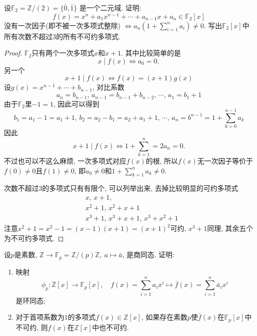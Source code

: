 \begin{problem}
    设$\mathbb{F}_2 = \mathbb{Z}/(2) = \{\bar{0}, \bar{1}\}$
是一个二元域. 证明: 
\[
    f(x) = x^n + a_1x^{n - 1} + \cdots + a_{n - 1}x + a_n \in \mathbb{F}_2[x]
\]
没有一次因子(即不被一次多项式整除)
\(
    \Leftrightarrow a_n\left(1 + \sum_{i = 1}^n a_i\right) \neq 0.
\)
写出$\mathbb{F}_2[x]$中所有次数不超过$3$的所有不可约多项式.
\end{problem}

\begin{proof}
    $\mathbb{F}_2$只有两个一次多项式$x$和$x + 1$. 其中比较简单的是
    \[
        x \mid f(x) \iff a_0 = 0,
    \]
    另一个
    \[
        x + 1 \mid f(x) \iff f(x) = (x + 1)g(x)
    \]
    设$g(x) = x^{n - 1} + \cdots + b_{n - 1}$, 对比系数
    \[
        a_n = b_{n - 1},\, a_{n - 1} = b_{n - 1} + b_{n - 2},\, \cdots,\, a_{1} = b_1 + 1
    \]
    由于$\mathbb{F}_2$里$-1 = 1$, 因此可以得到
    \[
        b_1 = a_1 - 1 = a_1 + 1,\, b_2 = a_2 - b_1 = a_2 + a_1 + 1,\, \cdots,\, a_n = b^{n - 1} = 1 + \sum_{k = 0}^{n - 1} a_k
    \]
    因此
    \[
        x + 1 \mid f(x) \iff 1 + \sum_{k = 1}^{n} = 2a_n = 0.
    \]
    不过也可以不这么麻烦, 一次多项式对应$f(x)$的根, 所以$f(x)$无一次因子等价于$f(0) \neq 0$且$f(1) \neq 0$, 即$a_0 \neq 0$和$1 + \sum_{k = 1}^{n} a_k \neq 0$.

    次数不超过$3$的多项式只有有限个, 可以列举出来, 去掉比较明显的可约多项式
    \[
    \begin{aligned}
        &x,\, x + 1,\\
        &x^2 + 1,\, x^2 + x + 1\\
        &x^3 + 1,\, x^3 + x + 1,\, x^3 + x^2 + 1
    \end{aligned}
    \]
    注意$x^2 + 1 = x^2 - 1 = (x - 1)(x + 1) = (x + 1)^2$可约, $x^3 + 1$同理, 其余五个为不可约多项式.
\end{proof}

\begin{problem}
    设$p$是素数, $\mathbb{Z} \to \mathbb{F}_p = \mathbb{Z}/(p)\mathbb{Z},~a \mapsto \bar{a}$,
是商同态. 证明: 
\begin{enumerate}[(1)]
    \item 映射
\[
    \phi_p:\mathbb{Z}[x] \to \mathbb{F}_p[x],\quad f(x) = \sum_{i = 1}^n a_ix^i \mapsto \bar{f}(x) = \sum_{i = 1}^n \bar{a}_ix^i
\]
是环同态;
    \item 对于首项系数为$1$的多项式$f(x) \in \mathbb{Z}[x]$,
如果存在素数$p$使$\bar{f}(x)$在$\mathbb{F}_p[x]$中不可约, 
则$f(x)$在$\mathbb{Z}[x]$中也不可约.
\end{enumerate}
\end{problem}

